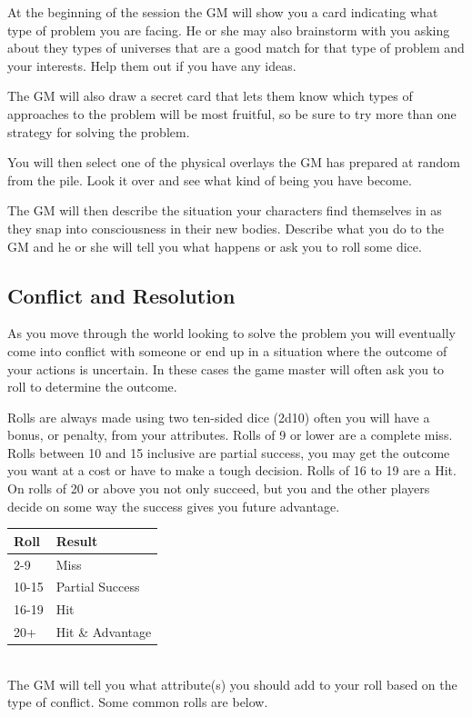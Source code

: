 \documentclass[letterpaper,12pt,landscape,twocolumn]{book}
\begin{document}
At the beginning of the session the GM will show you a card indicating
what type of problem you are facing. He or she may also brainstorm
with you asking about they types of universes that are a good match
for that type of problem and your interests. Help them out if you have
any ideas.

The GM will also draw a secret card that lets them know which types of
approaches to the problem will be most fruitful, so be sure to try
more than one strategy for solving the problem.

You will then select one of the physical overlays the GM has prepared
at random from the pile. Look it over and see what kind of being you
have become.

The GM will then describe the situation your characters find
themselves in as they snap into consciousness in their new
bodies. Describe what you do to the GM and he or she will tell you
what happens or ask you to roll some dice.

\subsection{Conflict and Resolution}

As you move through the world looking to solve the problem you will
eventually come into conflict with someone or end up in a situation
where the outcome of your actions is uncertain. In these cases the
game master will often ask you to roll to determine the outcome. 

Rolls are always made using two ten-sided dice (2d10) often you will
have a bonus, or penalty, from your attributes. Rolls of 9 or lower
are a complete miss. Rolls between 10 and 15 inclusive are partial
success, you may get the outcome you want at a cost or have to make a
tough decision. Rolls of 16 to 19 are a Hit. On rolls of 20 or above
you not only succeed, but you and the other players decide on some way
the success gives you future advantage. 

\begin{tabularx}{0.45\textwidth}{p{2cm}|X}
  \textbf{Roll} & \textbf{Result} \\ \hline
  2-9 & Miss \\ \hline
  10-15 & Partial Success \\ \hline
  16-19 & Hit \\ \hline
  20+ & Hit \& Advantage \\ 
\end{tabularx}
\\
The GM will tell you what attribute(s) you should add to your
roll based on the type of conflict. Some common rolls are below.
\end{document}
